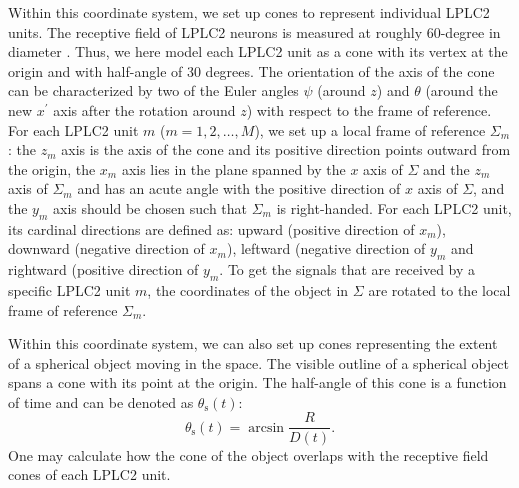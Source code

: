 \documentclass[pdftex,9pt,lineno]{elife}
\begin{document}
Within this coordinate system, we set up cones to represent individual LPLC2 units. The receptive field of LPLC2 neurons is measured at roughly 60-degree in diameter \citep{klapoetke2017ultra}. Thus, we here model each LPLC2 unit as a cone with its vertex at the origin and with half-angle of 30 degrees. The orientation of the axis of the cone can be characterized by two of the Euler angles $\psi$ (around $z$) and $\theta$ (around the new $x^{'}$ axis after the rotation around $z$) with respect to the frame of reference. For each LPLC2 unit $m$ ($m=1, 2, \dots, M$), we set up a local frame of reference $\Sigma_{m}$: the $z_{m}$ axis is the axis of the cone and its positive direction points outward from the origin, the $x_{m}$ axis lies in the plane spanned by the $x$ axis of $\Sigma$ and the $z_{m}$ axis of $\Sigma_{m}$ and has an acute angle with the positive direction of $x$ axis of $\Sigma$, and the $y_{m}$ axis should be chosen such that $\Sigma_{m}$ is right-handed. For each LPLC2 unit, its cardinal directions are defined as: upward (positive direction of $x_{m}$), downward (negative direction of $x_{m}$), leftward (negative direction of $y_{m}$ and rightward (positive direction of $y_{m}$. To get the signals that are received by a specific LPLC2 unit $m$, the coordinates of the object in $\Sigma$ are rotated to the local frame of reference $\Sigma_{m}$.

Within this coordinate system, we can also set up cones representing the extent of a spherical object moving in the space. The visible outline of a spherical object spans a cone with its point at the origin. The half-angle of this cone is a function of time and can be denoted as $\theta_{\text{s}}(t)$:
\begin{equation}
\theta_{\text{s}}(t) = \arcsin{\frac{R}{D(t)}}.
\end{equation}
One may calculate how the cone of the object overlaps with the receptive field cones of each LPLC2 unit.
\end{document}
